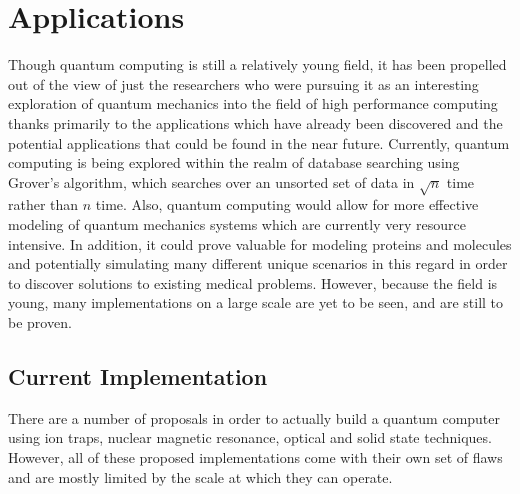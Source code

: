 \documentclass[12pt]{article}
\begin{document}
\section{Applications}
Though quantum computing is still a relatively young field, it has been propelled out of the view of just the researchers who were pursuing it as an interesting exploration of quantum mechanics into the field of high performance computing thanks primarily to the applications which have already been discovered and the potential applications that could be found in the near future. Currently, quantum computing is being explored within the realm of database searching using Grover's algorithm, which searches over an unsorted set of data in $\sqrt{n}$ time rather than $n$ time. Also, quantum computing would allow for more effective modeling of quantum mechanics systems which are currently very resource intensive. In addition, it could prove valuable for modeling proteins and molecules and potentially simulating many different unique scenarios in this regard in order to discover solutions to existing medical problems. However, because the field is young, many implementations on a large scale are yet to be seen, and are still to be proven.
\subsection{Current Implementation}
There are a number of proposals in order to actually build a quantum computer using ion traps, nuclear magnetic resonance, optical and solid state techniques. \cite{non} However, all of these proposed implementations come with their own set of flaws and are mostly limited by the scale at which they can operate.
\end{document}
